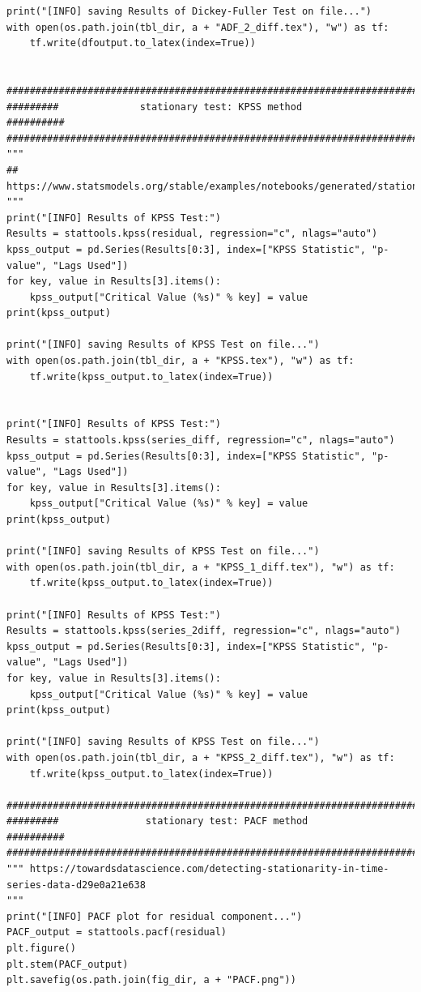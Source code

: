 \documentclass[12pt]{article}
\begin{document}
\begin{lstlisting}
print("[INFO] saving Results of Dickey-Fuller Test on file...")
with open(os.path.join(tbl_dir, a + "ADF_2_diff.tex"), "w") as tf:
    tf.write(dfoutput.to_latex(index=True))


############################################################################
#########              stationary test: KPSS method               ##########
############################################################################
"""
## https://www.statsmodels.org/stable/examples/notebooks/generated/stationarity_detrending_adf_kpss.html
"""
print("[INFO] Results of KPSS Test:")
Results = stattools.kpss(residual, regression="c", nlags="auto")
kpss_output = pd.Series(Results[0:3], index=["KPSS Statistic", "p-value", "Lags Used"])
for key, value in Results[3].items():
    kpss_output["Critical Value (%s)" % key] = value
print(kpss_output)

print("[INFO] saving Results of KPSS Test on file...")
with open(os.path.join(tbl_dir, a + "KPSS.tex"), "w") as tf:
    tf.write(kpss_output.to_latex(index=True))


print("[INFO] Results of KPSS Test:")
Results = stattools.kpss(series_diff, regression="c", nlags="auto")
kpss_output = pd.Series(Results[0:3], index=["KPSS Statistic", "p-value", "Lags Used"])
for key, value in Results[3].items():
    kpss_output["Critical Value (%s)" % key] = value
print(kpss_output)

print("[INFO] saving Results of KPSS Test on file...")
with open(os.path.join(tbl_dir, a + "KPSS_1_diff.tex"), "w") as tf:
    tf.write(kpss_output.to_latex(index=True))

print("[INFO] Results of KPSS Test:")
Results = stattools.kpss(series_2diff, regression="c", nlags="auto")
kpss_output = pd.Series(Results[0:3], index=["KPSS Statistic", "p-value", "Lags Used"])
for key, value in Results[3].items():
    kpss_output["Critical Value (%s)" % key] = value
print(kpss_output)

print("[INFO] saving Results of KPSS Test on file...")
with open(os.path.join(tbl_dir, a + "KPSS_2_diff.tex"), "w") as tf:
    tf.write(kpss_output.to_latex(index=True))

############################################################################
#########               stationary test: PACF method              ##########
############################################################################
""" https://towardsdatascience.com/detecting-stationarity-in-time-series-data-d29e0a21e638
"""
print("[INFO] PACF plot for residual component...")
PACF_output = stattools.pacf(residual)
plt.figure()
plt.stem(PACF_output)
plt.savefig(os.path.join(fig_dir, a + "PACF.png"))


\end{lstlisting}
\end{document}
